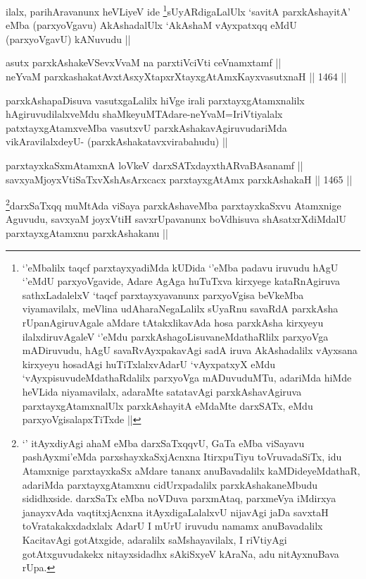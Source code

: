 \begin{artha}
ilalx, parihAravanunx heVLiyeV ide \footnote{`\stext'eMbalilx taqcf parxtayxyadiMda kUDida `\stext'eMba padavu iruvudu hAgU `\stext'eMdU parxyoVgavide, Adare AgAga huTuTxva kirxyege kataRnAgiruva sathxLadalelxV `taqcf parxtayxyavanunx parxyoVgisa beVkeMba viyamavilalx, meVlina udAharaNegaLalilx sUyaRnu savaRdA parxkAsha rUpanAgiruvAgale aMdare tAtakxlikavAda hosa parxkAsha kirxyeyu ilalxdiruvAgaleV `\stext'eMdu parxkAshagoLisuvaneMdathaRlilx parxyoVga mADiruvudu, hAgU savaRvAyxpakavAgi sadA iruva AkAshadalilx vAyxsana kirxyeyu hosadAgi huTiTxlalxvAdarU `vAyxpatxyX eMdu `vAyxpisuvudeMdathaRdalilx parxyoVga mADuvuduMTu, adariMda hiMde heVLida niyamavilalx, adaraMte satatavAgi parxkAshavAgiruva parxtayxgAtamxnalUlx parxkAshayitA eMdaMte darxSATx, eMdu parxyoVgisalapxTiTxde ||}sUyARdigaLalUlx `savitA parxkAshayitA' eMba (parxyoVgavu) AkAshadalUlx `AkAshaM vAyxpatxqq eMdU (parxyoVgavU) kANuvudu ||
\end{artha}


\begin{shl}
asutx parxkAshakeVSevxVvaM na parxtiVciVti ceVnamxtamf || \\
neYvaM parxkashakatAvxtAsxyXtapxrXtayxgAtAmxKayxvasutxnaH ||  1464 ||  
\end{shl}

\begin{artha}
parxkAshapaDisuva vasutxgaLalilx hiVge irali parxtayxgAtamxnalilx hAgiruvudilalxveMdu shaMkeyuMTAdare-neYvaM=IriVtiyalalx patxtayxgAtamxveMba vasutxvU parxkAshakavAgiruvudariMda vikAravilalxdeyU- (parxkAshakatavxvirabahudu) ||
\end{artha}


\begin{shl}
parxtayxkaSxmAtamxnA loVkeV darxSATxdayxthARvaBAsanamf || \\
savxyaMjoyxVtiSaTxvXshAsArxcacx parxtayxgAtAmx parxkAshakaH ||  1465 ||  
\end{shl}

\begin{artha}
\footnote{`\stext' itAyxdiyAgi ahaM eMba darxSaTxqqvU, GaTa eMba viSayavu pashAyxmi'eMda parxshayxkaSxjAcnxna ItirxpuTiyu toVruvadaSiTx, idu Atamxnige parxtayxkaSx aMdare tananx anuBavadalilx kaMDideyeMdathaR, adariMda parxtayxgAtamxnu cidUrxpadalilx parxkAshakaneMbudu sididhxside. darxSaTx eMba noVDuva parxmAtaq, parxmeVya iMdirxya janayxvAda vaqtitxjAcnxna itAyxdigaLalalxvU nijavAgi jaDa savxtaH toVratakakxdadxlalx AdarU I mUrU iruvudu namamx anuBavadalilx KacitavAgi gotAtxgide, adaralilx saMshayavilalx, I riVtiyAgi gotAtxguvudakekx nitayxsidadhx sAkiSxyeV kAraNa, adu nitAyxnuBava rUpa.}darxSaTxqq muMtAda viSaya parxkAshaveMba parxtayxkaSxvu Atamxnige Aguvudu, savxyaM joyxVtiH savxrUpavanunx boVdhisuva shAsatxrXdiMdalU parxtayxgAtamxnu parxkAshakanu ||
\end{artha}

